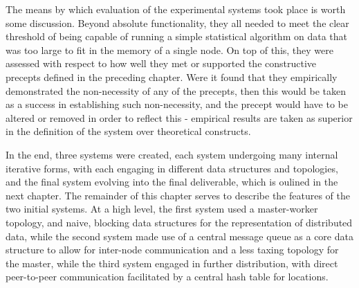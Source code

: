The means by which evaluation of the experimental systems took place is worth some discussion.
Beyond absolute functionality, they all needed to meet the clear threshold of being capable of running a simple statistical algorithm on data that was too large to fit in the memory of a single node.
On top of this, they were assessed with respect to how well they met or supported the constructive precepts defined in the preceding chapter.
Were it found that they empirically demonstrated the non-necessity of any of the precepts, then this would be taken as a success in establishing such non-necessity, and the precept would have to be altered or removed in order to reflect this - empirical results are taken as superior in the definition of the system over theoretical constructs.

In the end, three systems were created, each system undergoing many internal iterative forms, with each engaging in different data structures and topologies, and the final system evolving into the final deliverable, which is oulined in the next chapter.
The remainder of this chapter serves to describe the features of the two initial systems.
At a high level, the first system used a master-worker topology, and naive, blocking data structures for the representation of distributed data, while the second system made use of a central message queue as a core data structure to allow for inter-node communication and a less taxing topology for the master, while the third system engaged in further distribution, with direct peer-to-peer communication facilitated by a central hash table for locations.
